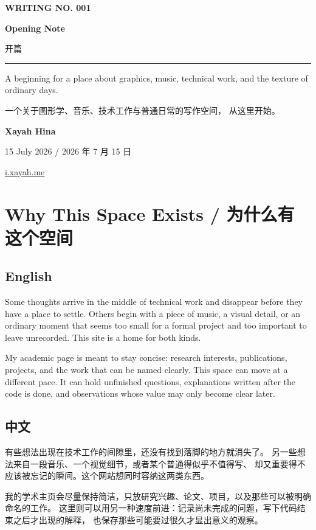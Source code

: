 \documentclass[11pt,a4paper,fontset=fandol]{ctexart}
\newcommand{\languagepair}[2]{%
  \subsection{English}
  #1
  \subsection{中文}
  #2
}
\begin{document}
\hypersetup{pageanchor=false}
\begin{titlepage}
  \thispagestyle{empty}

  {\small\bfseries\color{accent}\MakeUppercase{Writing No. 001}\par}

  \vspace*{0.18\textheight}

  {\fontsize{39}{43}\selectfont\bfseries\color{ink}Opening Note\par}
  \vspace{0.45em}
  {\fontsize{25}{31}\selectfont\color{softink}开篇\par}

  \vspace{2.2em}
  {\color{rulecolor}\rule{\textwidth}{0.7pt}\par}
  \vspace{1.4em}

  {\large\color{softink}
    A beginning for a place about graphics, music, technical work,
    and the texture of ordinary days.\par
  }
  \vspace{0.8em}
  {\large\color{softink}
    一个关于图形学、音乐、技术工作与普通日常的写作空间，
    从这里开始。\par
  }

  \vfill

  {\large\bfseries Xayah Hina\par}
  \vspace{0.35em}
  {\color{softink}15 July 2026 / 2026 年 7 月 15 日\par}
  \vspace{0.35em}
  {\small\href{https://i.xayah.me/}{i.xayah.me}\par}
\end{titlepage}
\hypersetup{pageanchor=true}

\section{Why This Space Exists / 为什么有这个空间}

\languagepair{
  Some thoughts arrive in the middle of technical work and disappear before
  they have a place to settle. Others begin with a piece of music, a visual
  detail, or an ordinary moment that seems too small for a formal project and
  too important to leave unrecorded. This site is a home for both kinds.

  My academic page is meant to stay concise: research interests, publications,
  projects, and the work that can be named clearly. This space can move at a
  different pace. It can hold unfinished questions, explanations written after
  the code is done, and observations whose value may only become clear later.
}{
  有些想法出现在技术工作的间隙里，还没有找到落脚的地方就消失了。
  另一些想法来自一段音乐、一个视觉细节，或者某个普通得似乎不值得写、
  却又重要得不应该被忘记的瞬间。这个网站想同时容纳这两类东西。

  我的学术主页会尽量保持简洁，只放研究兴趣、论文、项目，以及那些可以被明确命名的工作。
  这里则可以用另一种速度前进：记录尚未完成的问题，写下代码结束之后才出现的解释，
  也保存那些可能要过很久才显出意义的观察。
}
\end{document}
